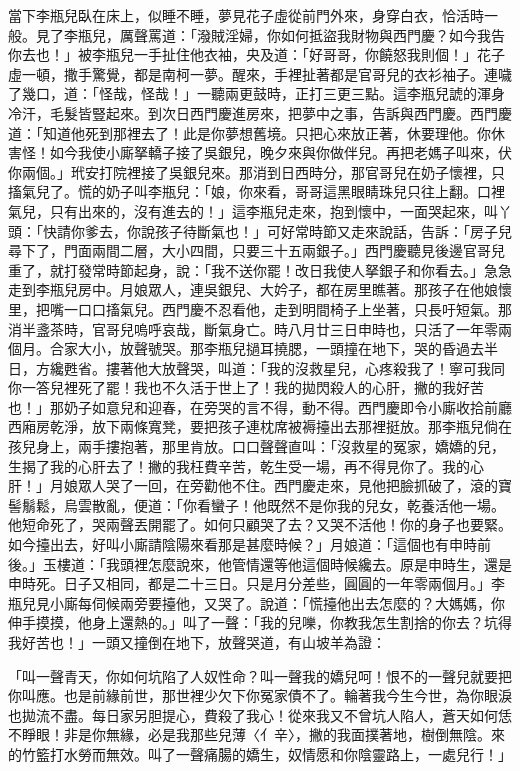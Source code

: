 \begin{showcontents}{}
當下李瓶兒臥在床上，似睡不睡，夢見花子虛從前門外來，身穿白衣，恰活時一般。見了李瓶兒，厲聲罵道：「潑賊淫婦，你如何抵盜我財物與西門慶？如今我告你去也！」被李瓶兒一手扯住他衣袖，央及道：「好哥哥，你饒怒我則個！」花子虛一頓，撒手驚覺，都是南柯一夢。醒來，手裡扯著都是官哥兒的衣衫袖子。連噦了幾口，道：「怪哉，怪哉！」一聽兩更鼓時，正打三更三點。這李瓶兒諕的渾身冷汗，毛髮皆豎起來。到次日西門慶進房來，把夢中之事，告訴與西門慶。西門慶道：「知道他死到那裡去了！此是你夢想舊境。只把心來放正著，休要理他。你休害怪！如今我使小廝拏轎子接了吳銀兒，晚夕來與你做伴兒。再把老媽子叫來，伏你兩個。」玳安打院裡接了吳銀兒來。那消到日西時分，那官哥兒在奶子懷裡，只搐氣兒了。慌的奶子叫李瓶兒：「娘，你來看，哥哥這黑眼睛珠兒只往上翻。口裡氣兒，只有出來的，沒有進去的！」這李瓶兒走來，抱到懷中，一面哭起來，叫丫頭：「快請你爹去，你說孩子待斷氣也！」可好常時節又走來說話，告訴：「房子兒尋下了，門面兩間二層，大小四間，只要三十五兩銀子。」西門慶聽見後邊官哥兒重了，就打發常時節起身，說：「我不送你罷！改日我使人拏銀子和你看去。」急急走到李瓶兒房中。月娘眾人，連吳銀兒、大妗子，都在房里瞧著。那孩子在他娘懷里，把嘴一口口搐氣兒。西門慶不忍看他，走到明間椅子上坐著，只長吁短氣。那消半盞茶時，官哥兒嗚呼哀哉，斷氣身亡。時八月廿三日申時也，只活了一年零兩個月。合家大小，放聲號哭。那李瓶兒撾耳撓腮，一頭撞在地下，哭的昏過去半日，方纔甦省。摟著他大放聲哭，叫道：「我的沒救星兒，心疼殺我了！寧可我同你一答兒裡死了罷！我也不久活于世上了！我的拋閃殺人的心肝，撇的我好苦也！」那奶子如意兒和迎春，在旁哭的言不得，動不得。西門慶即令小廝收拾前廳西廂房乾淨，放下兩條寬凳，要把孩子連枕席被褥擡出去那裡挺放。那李瓶兒倘在孩兒身上，兩手摟抱著，那里肯放。口口聲聲直叫：「沒救星的冤家，嬌嬌的兒，生揭了我的心肝去了！撇的我枉費辛苦，乾生受一場，再不得見你了。我的心肝！」月娘眾人哭了一回，在旁勸他不住。西門慶走來，見他把臉抓破了，滾的寶髻鬅鬆，烏雲散亂，便道：「你看蠻子！他既然不是你我的兒女，乾養活他一場。他短命死了，哭兩聲丟開罷了。如何只顧哭了去？又哭不活他！你的身子也要緊。如今擡出去，好叫小廝請陰陽來看那是甚麼時候？」月娘道：「這個也有申時前後。」玉樓道：「我頭裡怎麼說來，他管情還等他這個時候纔去。原是申時生，還是申時死。日子又相同，都是二十三日。只是月分差些，圓圓的一年零兩個月。」李瓶兒見小廝每伺候兩旁要擡他，又哭了。說道：「慌擡他出去怎麼的？大媽媽，你伸手摸摸，他身上還熱的。」叫了一聲：「我的兒嚛，你教我怎生割捨的你去？坑得我好苦也！」一頭又撞倒在地下，放聲哭道，有山坡羊為證：

「叫一聲青天，你如何坑陷了人奴性命？叫一聲我的嬌兒呵！恨不的一聲兒就要把你叫應。也是前緣前世，那世裡少欠下你冤家債不了。輪著我今生今世，為你眼淚也拋流不盡。每日家另胆提心，費殺了我心！從來我又不曾坑人陷人，蒼天如何恁不睜眼！非是你無緣，必是我那些兒薄〈亻辛〉，撇的我面撲著地，樹倒無陰。來的竹籃打水勞而無效。叫了一聲痛腸的嬌生，奴情愿和你陰靈路上，一處兒行！」


\end{showcontents}

